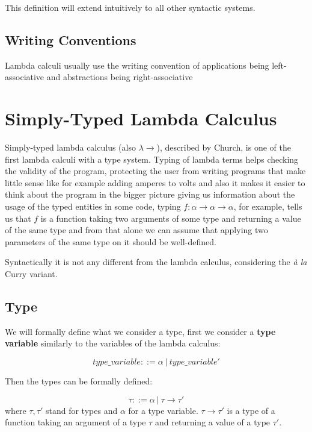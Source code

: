 This definition will extend intuitively to all other syntactic systems.

\subsection{Writing Conventions}

Lambda calculi usually use the writing convention of applications being left-associative and abstractions being right-associative


\section{Simply-Typed Lambda Calculus }

Simply-typed lambda calculus (also $\lambda\rightarrow$), described by Church, is one of the first %
lambda calculi with a type system. Typing of lambda terms helps checking the validity of the program, protecting the user from writing programs that make little sense like for example adding amperes to volts \cite{barendregt1992lambda} and also it makes it easier to think about the program in the bigger picture giving us information about the usage of the typed entities in some code, typing $f : \alpha \rightarrow \alpha \rightarrow \alpha$, for example, tells us that $f$ is a function taking two arguments of some type and returning a value of the same type and from that alone we can assume that applying two parameters of the same type on it should be well-defined.

Syntactically it is not any different from the lambda calculus, considering the \emph{\`a la} Curry variant. \cite{barendregt1992lambda}

\subsection{Type}

We will formally define what we consider a type, first we consider a \textbf{type variable} similarly to the variables of the lambda calculus:

\begin{defn}
    $$type\_variable ::= \alpha\ |\ type\_variable'$$
\end{defn}

Then the types can be formally defined:

\begin{defn}[Type]
    \label{defn:typeSTLC}
    $$\tau ::= \alpha\ |\ \tau \rightarrow \tau'$$
    where $\tau, \tau'$ stand for types and $\alpha$ for a type variable. $\tau \rightarrow \tau'$ is a type of a function taking an argument of a type $\tau$ and returning a value of a type $\tau'$.
\end{defn}

